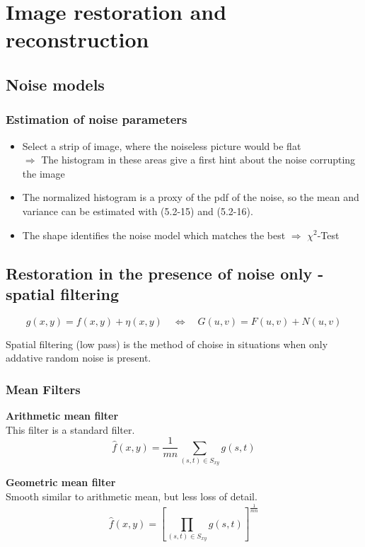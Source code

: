 \section{Image restoration and reconstruction }
\subsection{Noise models  }
	\subsubsection{Estimation of noise parameters}
		\begin{itemize}
			\item Select a strip of image, where the noiseless picture would be flat\\
			$\Rightarrow$ The histogram in these areas give a first hint about the noise corrupting the image 
			\item The normalized histogram is a proxy of the pdf of the noise, so the mean and variance can be estimated with (5.2-15) and (5.2-16).
			\item The shape identifies the noise model which matches the best $\Rightarrow$ $\chi^2$-Test			
		\end{itemize}
		

\subsection{Restoration in the presence of noise only - spatial filtering }
	\[
		g(x,y) = f(x,y) + \eta(x,y) \quad
		\Leftrightarrow \quad
		G(u,v) = F(u,v) + N(u,v)
	\]
	\begin{center}
		Spatial filtering (low pass) is the method of choise in situations when only addative random noise is present.
	\end{center}
	
\subsubsection{Mean Filters}
\textbf{Arithmetic mean filter}\\
This filter is a standard filter.
\begin{equation}
	\hat{f}(x,y)= \frac{1}{m  n} \sum\limits_{(s,t)\in S_{xy}}g(s,t)
\end{equation}

\textbf{Geometric mean filter}\\
Smooth similar to arithmetic mean, but less loss of detail.
\begin{equation}
	\hat{f}(x,y)= \left[\prod\limits_{(s,t)\in S_{xy}} g(s,t)\right]^\frac{1}{mn}
\end{equation}

